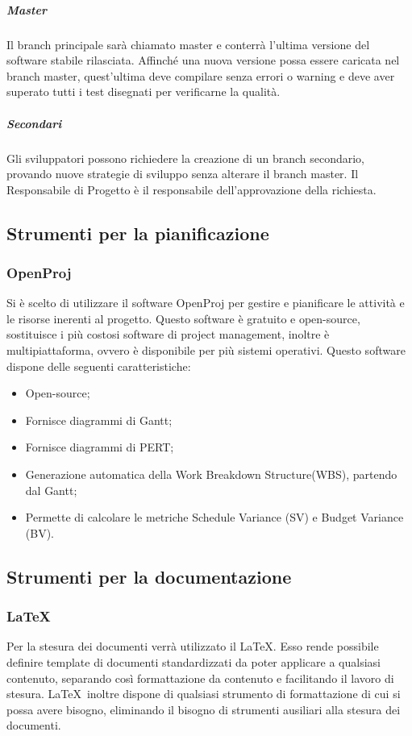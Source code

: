 \subparagraph{Master}
\label{4.4.1}
Il branch principale sarà chiamato master e conterrà l'ultima versione del software stabile rilasciata. Affinché una nuova versione possa essere caricata nel branch master, quest'ultima deve compilare senza errori o warning e deve aver superato tutti i test disegnati per verificarne la qualità.

\subparagraph{Secondari}
\label{4.4.2}
Gli sviluppatori possono richiedere la creazione di un branch secondario, provando nuove strategie di sviluppo senza alterare il branch master. Il Responsabile di Progetto è il responsabile dell'approvazione della richiesta.

\subsection{Strumenti per la pianificazione}
\label{}
\subsubsection{OpenProj}
Si è scelto di utilizzare il software OpenProj per gestire e pianificare le attività e le risorse inerenti al progetto.
Questo software è gratuito e open-source, sostituisce i più costosi software di project management, inoltre è multipiattaforma, ovvero è disponibile per più sistemi operativi.
Questo software dispone delle seguenti caratteristiche:
\begin{itemize}
\item Open-source;
\item Fornisce diagrammi di Gantt;
\item Fornisce diagrammi di PERT;
\item Generazione automatica della Work Breakdown Structure(WBS), partendo dal Gantt;
\item Permette di calcolare le metriche Schedule Variance (SV) e Budget Variance (BV).
\end{itemize}
\label{}


\subsection{Strumenti per la documentazione}
\label{}
\subsubsection{LaTeX}
\label{5.7}
Per la stesura dei documenti verrà utilizzato il  \LaTeX. Esso rende possibile definire template di documenti standardizzati da poter applicare a qualsiasi contenuto, separando così formattazione da contenuto e facilitando il lavoro di stesura. \LaTeX\ inoltre dispone di qualsiasi strumento di formattazione di cui si possa avere bisogno, eliminando il bisogno di strumenti ausiliari alla stesura dei documenti.

